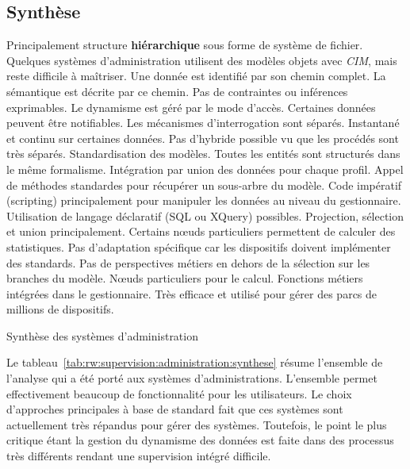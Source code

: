 \subsection{Synthèse}
\begin{table}[ht]
\criteretabDonnee
    {Principalement structure \textbf{hiérarchique} sous forme de système de fichier. Quelques systèmes d'administration utilisent des modèles objets avec \textit{CIM}, mais reste difficile à maîtriser.}
    {Une donnée est identifié par son chemin complet. La sémantique est décrite par ce chemin. Pas de contraintes ou inférences exprimables.}
    {Le dynamisme est géré par le mode d'accès. Certaines données peuvent être notifiables. Les mécanismes d'interrogation sont séparés.}
\criteretabTraitement
    {Instantané et continu sur certaines données. Pas d'hybride possible vu que les procédés sont très séparés.}
    {Standardisation des modèles. Toutes les entités sont structurés dans le même formalisme. Intégration par union des données pour chaque profil.}
    {Appel de méthodes standardes pour récupérer un sous-arbre du modèle. Code impératif (scripting) principalement pour manipuler les données au niveau du gestionnaire. Utilisation de langage déclaratif (SQL ou XQuery) possibles.}
    {Projection, sélection et union principalement. Certains nœuds particuliers permettent de calculer des statistiques.}
\criteretabAdaptabilite
    {Pas d'adaptation spécifique car les dispositifs doivent implémenter des standards.}
    {Pas de perspectives métiers en dehors de la sélection sur les branches du modèle.}
    {Nœuds particuliers pour le calcul. Fonctions métiers intégrées dans le gestionnaire.}
    {Très efficace et utilisé pour gérer des parcs de millions de dispositifs.}
\caption{Synthèse des systèmes d'administration}\label{tab:rw:supervision:administration:synthese}
\end{table}
Le tableau~\ref{tab:rw:supervision:administration:synthese} résume l'ensemble de l'analyse qui a été porté aux systèmes d'administrations. L'ensemble permet effectivement beaucoup de fonctionnalité pour les utilisateurs. Le choix d'approches principales à base de standard fait que ces systèmes sont actuellement très répandus pour gérer des systèmes. Toutefois, le point le plus critique étant la gestion du dynamisme des données est faite dans des processus très différents rendant une supervision intégré difficile.
